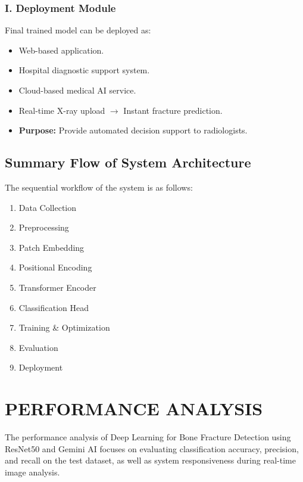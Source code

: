 \documentclass[a4paper,12pt]{report}
\begin{document}
    \subsection*{I. Deployment Module}
    Final trained model can be deployed as:
    \begin{itemize}
        \item Web-based application.
        \item Hospital diagnostic support system.
        \item Cloud-based medical AI service.
        \item Real-time X-ray upload $\rightarrow$ Instant fracture prediction.
        \item \textbf{Purpose:} Provide automated decision support to radiologists.
    \end{itemize}

    \section{Summary Flow of System Architecture}
    The sequential workflow of the system is as follows:
    \begin{enumerate}
        \item Data Collection
        \item Preprocessing
        \item Patch Embedding
        \item Positional Encoding
        \item Transformer Encoder
        \item Classification Head
        \item Training \& Optimization
        \item Evaluation
        \item Deployment
    \end{enumerate}





    \chapter{PERFORMANCE ANALYSIS}

    The performance analysis of Deep Learning for Bone Fracture Detection using ResNet50 and Gemini AI focuses on evaluating classification accuracy, precision, and recall on the test dataset, as well as system responsiveness during real-time image analysis.
\end{document}
